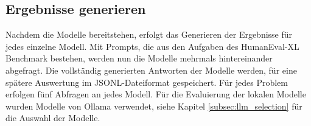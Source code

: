 





\subsection{Ergebnisse generieren}
Nachdem die Modelle bereitstehen, erfolgt das Generieren der Ergebnisse für jedes einzelne Modell. Mit Prompts, die aus den Aufgaben des HumanEval-XL Benchmark bestehen, werden nun die Modelle mehrmals hintereinander abgefragt. Die vollständig generierten Antworten der Modelle werden, für eine spätere Auswertung im JSONL-Dateiformat gespeichert. Für jedes Problem erfolgen fünf Abfragen an jedes Modell. Für die Evaluierung der lokalen Modelle wurden Modelle von Ollama verwendet, siehe Kapitel \ref{subsec:llm_selection} für die Auswahl der Modelle.

